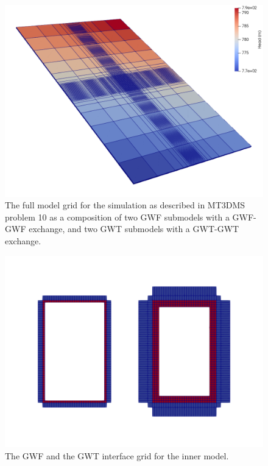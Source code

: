 \begin{figure}[!ht]
	\begin{center}
	\includegraphics[scale=0.35]{./Figures/InterfaceModel/gwt-ifmod-full.png}
	\caption[The full model grid from MT3DMS problem 10]{The full model grid for the simulation as described in MT3DMS problem 10 as a composition of two GWF submodels with a GWF-GWF exchange, and two GWT submodels with a GWT-GWT exchange.}
	\label{fig:gwtgwt-fullgrid}
	\end{center}
\end{figure}

\begin{figure}[!ht]
	\begin{center}
	\includegraphics[scale=0.5]{./Figures/InterfaceModel/gwt-ifmod-ifgrids.png}
	\caption[The GWF and the GWT interface grid for the inner model]{The GWF and the GWT interface grid for the inner model.}
	\label{fig:gwtgwt-fullgrid}
	\end{center}
\end{figure}

